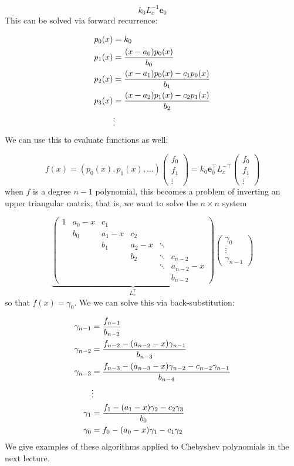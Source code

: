 \documentclass[12pt,a4paper]{article}
\def\vc#1{ {\mathbf #1} }
\begin{document}
\[
k_0 L_x^{-1} \vc e_0
\]
This  can be solved  via forward recurrence:


\begin{align*}
    p_0(x) &= k_0 \\
    p_1(x) &= {(x-a_0) p_0(x) \over b_0}\\
    p_2(x) &= {(x-a_1) p_0(x) - c_1 p_0(x) \over b_1}\\    
    p_3(x) &= {(x-a_2) p_1(x) - c_2 p_1(x) \over b_2}\\ 
    &\vdots
\end{align*}
We can use this to evaluate functions as well: 

\[
f(x) = (p_0(x),p_1(x),\ldots) \begin{pmatrix}f_0 \\ f_1\\ \vdots \end{pmatrix} = 
k_0 \vc e_0^\top L_x^{-\top}  \begin{pmatrix}f_0 \\ f_1\\ \vdots \end{pmatrix}
\]
when $f$ is a degree $n-1$ polynomial, this becomes a problem of inverting an upper triangular matrix,  that is, we want to solve the $n \times n$ system

\[
\underbrace{\begin{pmatrix}
1 & a_0-x & c_1 \\
& b_0 & a_1-x & c_2  \\
& & b_1 & a_2-x & \ddots  \\
& &     & b_2 & \ddots & c_{n-2} \\
&&&&\ddots & a_{n-2}-x \\
&&&&& b_{n-2}
\end{pmatrix}}_{L_x^\top} \begin{pmatrix} \gamma_0 \\\vdots\\ \gamma_{n-1} \end{pmatrix}
\]
so that $f(x) = \gamma_0$. We we can solve this  via back-substitution:


\begin{align*}
\gamma_{n-1} &= {f_{n-1} \over b_{n-2}} \\
\gamma_{n-2} &= {f_{n-2} - (a_{n-2}-x) \gamma_{n-1} \over b_{n-3}} \\
\gamma_{n-3} &= {f_{n-3} - (a_{n-3}-x) \gamma_{n-2} - c_{n-2} \gamma_{n-1} \over b_{n-4}} \\
& \vdots \\
\gamma_1 &= {f_1 - (a_1-x) \gamma_2 - c_2 \gamma_3 \over b_0} \\
\gamma_0 &= f_0 - (a_0-x) \gamma_1 - c_1 \gamma_2
\end{align*}
We give examples of these algorithms applied to Chebyshev polynomials in the next lecture.
\end{document}
